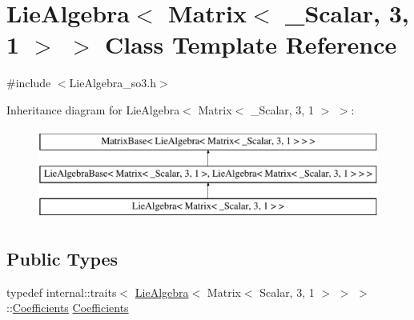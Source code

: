 \hypertarget{class_lie_algebra_3_01_matrix_3_01___scalar_00_013_00_011_01_4_01_4}{}\section{Lie\+Algebra$<$ Matrix$<$ \+\_\+\+Scalar, 3, 1 $>$ $>$ Class Template Reference}
\label{class_lie_algebra_3_01_matrix_3_01___scalar_00_013_00_011_01_4_01_4}


{\ttfamily \#include $<$Lie\+Algebra\+\_\+so3.\+h$>$}

Inheritance diagram for Lie\+Algebra$<$ Matrix$<$ \+\_\+\+Scalar, 3, 1 $>$ $>$\+:\begin{figure}[H]
\begin{center}
\leavevmode
\includegraphics[height=3.000000cm]{class_lie_algebra_3_01_matrix_3_01___scalar_00_013_00_011_01_4_01_4}
\end{center}
\end{figure}
\subsection*{Public Types}
\begin{DoxyCompactItemize}
\item 
typedef internal\+::traits$<$ \hyperlink{class_lie_algebra}{Lie\+Algebra}$<$ Matrix$<$ Scalar, 3, 1 $>$ $>$ $>$\+::\hyperlink{class_lie_algebra_3_01_matrix_3_01___scalar_00_013_00_011_01_4_01_4_a028504a0d794d492dc47b2edd056fe47}{Coefficients} \hyperlink{class_lie_algebra_3_01_matrix_3_01___scalar_00_013_00_011_01_4_01_4_a028504a0d794d492dc47b2edd056fe47}{Coefficients}
\end{DoxyCompactItemize}
